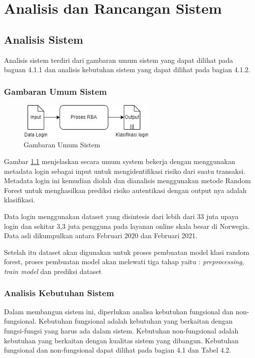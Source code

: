 \chapter{Analisis dan Rancangan Sistem}

\section{Analisis Sistem}

Analisis sistem terdiri dari gambaran umum sistem yang dapat dilihat pada baguan 4.1.1 dan analisis kebutuhan sistem yang dapat dilihat pada bagian 4.1.2.

\subsection{Gambaran Umum Sistem}
\begin{figure}[H]
    \centering
    \includegraphics[width=0.6\textwidth]{contents/chapter-4/gambaran-umum.png}
    \caption{Gambaran Umum Sistem}
    \label{fig:gambaran-umum}
\end{figure}
Gambar \ref{fig:gambaran-umum} menjelaskan secara umum system bekerja dengan menggunakan metadata login sebagai input untuk mengidentifikasi risiko dari suatu transaksi. Metadata login ini kemudian diolah dan dianalisis menggunakan metode Random Forest untuk menghasilkan prediksi risiko autentikasi dengan output nya adalah klasifikasi.

Data login menggunakan dataset yang disintesis dari lebih dari 33 juta upaya login dan sekitar 3,3 juta pengguna pada layanan online skala besar di Norwegia. Data asli dikumpulkan antara Februari 2020 dan Februari 2021.

Setelah itu dataset akan digunakan untuk proses pembuatan model klasi random forest, proses pembuatan model akan melewati tiga tahap yaitu : \textit{preprocessing}, \textit{train model}
dan prediksi dataset


\subsection{Analisis Kebutuhan Sistem}
Dalam membangun sistem ini, diperlukan analisa kebutuhan fungsional dan non-fungsional. Kebutuhan fungsional adalah kebutuhan yang berkaitan dengan fungsi-fungsi yang harus ada dalam sistem. Kebutuhan non-fungsional adalah kebutuhan yang berkaitan dengan kualitas sistem yang dibangun. Kebutuhan fungsional dan non-fungsional dapat dilihat pada bagian 4.1 dan Tabel 4.2.

